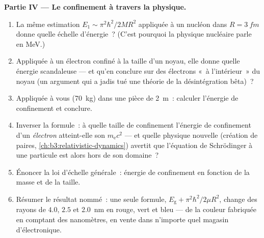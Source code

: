 \begin{problem}
\medskip\noindent\textbf{Partie IV --- Le confinement à travers la physique.}
\begin{enumerate}[resume]
  \item La même estimation $E_1 \sim \pi^2\hbar^2/2MR^2$ appliquée à un
        nucléon dans $R = \qty{3}{fm}$ donne quelle échelle d'énergie~?
        (C'est pourquoi la physique nucléaire parle en MeV.)
  \item Appliquée à un électron confiné à la taille d'un noyau, elle
        donne quelle énergie scandaleuse --- et qu'en conclure sur des
        électrons «~à l'intérieur~» du noyau (un argument qui a jadis
        tué une théorie de la désintégration bêta)~?
  \item Appliquée à vous (\qty{70}{kg}) dans une pièce de \qty{2}{m}~:
        calculer l'énergie de confinement et conclure.
  \item Inverser la formule~: à quelle taille de confinement l'énergie
        de confinement d'un \emph{électron} atteint-elle son  $m_{\text{e}}c^2$ --- et quelle physique nouvelle
        (création de paires, \cref{ch:b3:relativistic-dynamics})
        avertit que l'équation de Schrödinger à une particule est alors
        hors de son domaine~?
  \item Énoncer la loi d'échelle générale~: énergie de confinement en
        fonction de la masse et de la taille.
  \item Résumer le résultat nommé~: une seule formule,
        $E_{\text{g}} + \pi^2\hbar^2/2\mu R^2$, change des rayons de
        $4.0$, $2.5$ et \qty{2.0}{nm} en rouge, vert et bleu --- de la
        couleur fabriquée en comptant des nanomètres, en vente dans
        n'importe quel magasin d'électronique.
\end{enumerate}
\end{problem}
